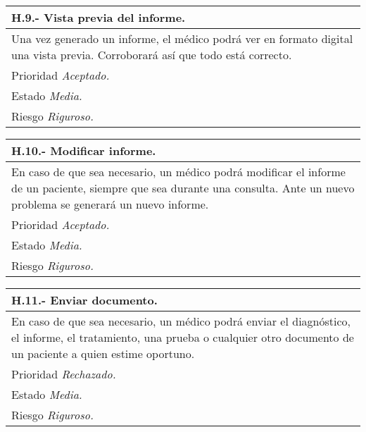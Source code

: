 	\begin{center}
	\begin{tabulary}{15cm}{|L|}
		\hline
			\bf{H.9.- Vista previa del informe.} \\
		\hline
			Una vez generado un informe, el médico podrá ver en formato digital una vista previa. Corroborará así que todo está correcto. \\
		\hline
			Prioridad \textit{Aceptado.} \\
		\hline
			Estado \textit{Media.} \\
		\hline
			Riesgo \textit{Riguroso.} \\
		\hline
	\end{tabulary}
	\end{center}

	\begin{center}
	\begin{tabulary}{15cm}{|L|}
		\hline
			\bf{H.10.- Modificar informe.} \\
		\hline
			En caso de que sea necesario, un médico podrá modificar el informe de un paciente, siempre que sea durante una consulta. Ante un nuevo problema se generará un nuevo informe.\\
		\hline
			Prioridad \textit{Aceptado.} \\
		\hline
			Estado \textit{Media.} \\
		\hline
			Riesgo \textit{Riguroso.} \\
		\hline
	\end{tabulary}
	\end{center}

	\begin{center}
	\begin{tabulary}{15cm}{|L|}
		\hline
			\bf{H.11.- Enviar documento.} \\
		\hline
			En caso de que sea necesario, un médico podrá enviar el diagnóstico, el informe, el tratamiento, una prueba o cualquier otro documento de un paciente a quien estime oportuno. \\
		\hline
			Prioridad \textit{Rechazado.} \\
		\hline
			Estado \textit{Media.} \\
		\hline
			Riesgo \textit{Riguroso.} \\
		\hline
	\end{tabulary}
	\end{center}

